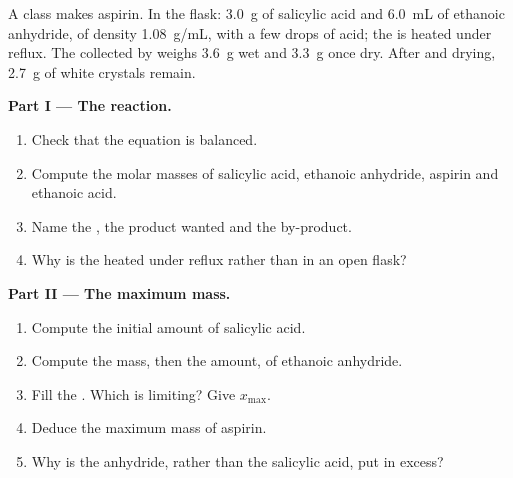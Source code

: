 \begin{problem}
\label{pb:g10:synthesis-yield:1}
A class makes aspirin. In the flask: \qty{3.0}{g} of salicylic acid and
\qty{6.0}{mL} of ethanoic anhydride, of density \qty{1.08}{g/mL}, with a
few drops of acid; the  is heated under reflux. The 
collected by  weighs \qty{3.6}{g} wet and \qty{3.3}{g}
once dry. After  and drying, \qty{2.7}{g} of white
crystals remain.

\medskip
\noindent\textbf{Part I --- The reaction.}
\begin{enumerate}
  \item Check that the equation
         is balanced.
  \item Compute the molar masses of salicylic acid, ethanoic anhydride,
        aspirin and ethanoic acid.
  \item Name the , the product wanted and the by-product.
  \item Why is the  heated under reflux rather than in an open
        flask?
\end{enumerate}

\medskip
\noindent\textbf{Part II --- The maximum mass.}
\begin{enumerate}[resume]
  \item Compute the initial amount of salicylic acid.
  \item Compute the mass, then the amount, of ethanoic anhydride.
  \item Fill the . Which  is limiting? Give
        $x_{\max}$.
  \item Deduce the maximum mass of aspirin.
  \item Why is the anhydride, rather than the salicylic acid, put in
        excess?
\end{enumerate}


\end{problem}
